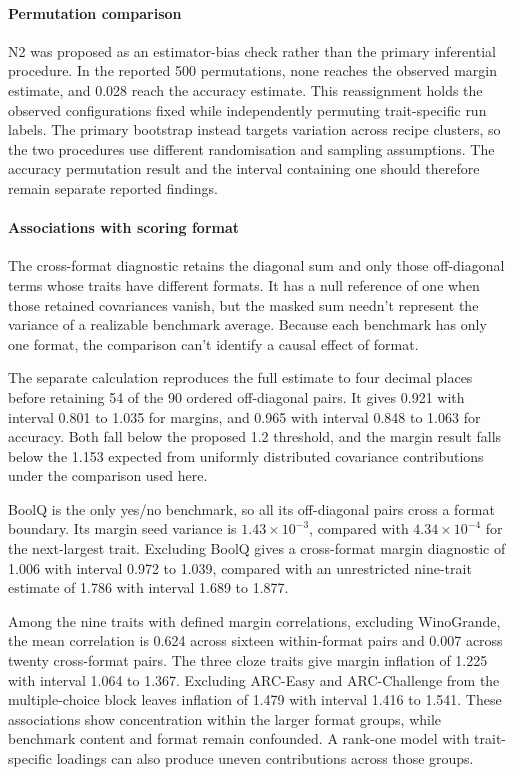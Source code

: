 \paragraph{Permutation comparison}
N2 was proposed as an estimator-bias check rather than the primary inferential procedure. In the reported 500 permutations, none reaches the observed margin estimate, and 0.028 reach the accuracy estimate. This reassignment holds the observed configurations fixed while independently permuting trait-specific run labels. The primary bootstrap instead targets variation across recipe clusters, so the two procedures use different randomisation and sampling assumptions. The accuracy permutation result and the interval containing one should therefore remain separate reported findings.

\paragraph{Associations with scoring format}
The cross-format diagnostic retains the diagonal sum and only those off-diagonal terms whose traits have different formats. It has a null reference of one when those retained covariances vanish, but the masked sum needn't represent the variance of a realizable benchmark average. Because each benchmark has only one format, the comparison can't identify a causal effect of format.

The separate calculation reproduces the full estimate to four decimal places before retaining 54 of the 90 ordered off-diagonal pairs. It gives 0.921 with interval 0.801 to 1.035 for margins, and 0.965 with interval 0.848 to 1.063 for accuracy. Both fall below the proposed 1.2 threshold, and the margin result falls below the 1.153 expected from uniformly distributed covariance contributions under the comparison used here.

BoolQ is the only yes/no benchmark, so all its off-diagonal pairs cross a format boundary. Its margin seed variance is $1.43\times10^{-3}$, compared with $4.34\times10^{-4}$ for the next-largest trait. Excluding BoolQ gives a cross-format margin diagnostic of 1.006 with interval 0.972 to 1.039, compared with an unrestricted nine-trait estimate of 1.786 with interval 1.689 to 1.877.

Among the nine traits with defined margin correlations, excluding WinoGrande, the mean correlation is 0.624 across sixteen within-format pairs and 0.007 across twenty cross-format pairs. The three cloze traits give margin inflation of 1.225 with interval 1.064 to 1.367. Excluding ARC-Easy and ARC-Challenge from the multiple-choice block leaves inflation of 1.479 with interval 1.416 to 1.541. These associations show concentration within the larger format groups, while benchmark content and format remain confounded. A rank-one model with trait-specific loadings can also produce uneven contributions across those groups.

